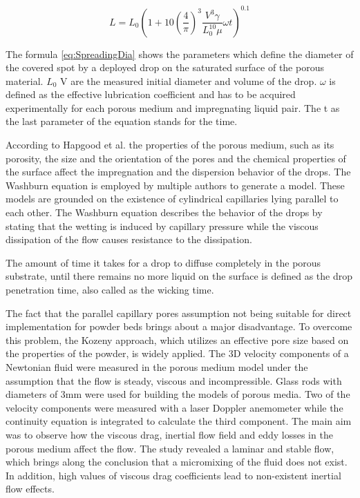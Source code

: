 \begin{equation} \label{eq:SpreadingDia}
L=L_0 (1+10(\frac{4}{\pi})^3 \frac{V^3 \gamma}{L_0^{10} \mu}\omega t)^{0.1}
\end{equation}
\bigskip

The formula \ref{eq:SpreadingDia} shows the parameters which define the diameter of the covered spot by a deployed drop on the saturated surface of the porous material. $L_0$ V are the measured initial diameter and volume of the drop. $\omega$ is defined as the effective lubrication coefficient and has to be acquired experimentally for each porous medium and impregnating liquid pair. The t as the last parameter of the equation stands for the time. 

According to Hapgood et al. the properties of the porous medium, such as its porosity, the size and the orientation of the pores and the chemical properties of the surface affect the impregnation and the dispersion behavior of the drops. The Washburn equation is employed by multiple authors to generate a model. These models are grounded on the existence of cylindrical capillaries lying parallel to each other. The Washburn equation describes the behavior of the drops by stating that the wetting is induced by capillary pressure while the viscous dissipation of the flow causes resistance to the dissipation.

The amount of time it takes for a drop to diffuse completely in the porous substrate, until there remains no more liquid on the surface is defined as the drop penetration time, also called as the wicking time.

The fact that the parallel capillary pores assumption not being suitable for direct implementation for powder beds brings about a major disadvantage. To overcome this problem, the Kozeny approach, which utilizes an effective pore size based on the properties of the powder, is widely applied. The 3D velocity components of a Newtonian fluid were measured in the porous medium model under the assumption that the flow is steady, viscous and incompressible. Glass rods with diameters of 3mm were used for building the models of porous media. Two of the velocity components were measured with a laser Doppler anemometer while the  continuity equation is integrated to calculate the third component. The main aim was to observe how the viscous drag, inertial flow field and eddy losses in the porous medium affect the flow. The study revealed a laminar and stable  flow, which brings along the conclusion  that a micromixing of the fluid does not exist. In addition, high values of viscous drag coefficients lead to non-existent inertial flow effects.

